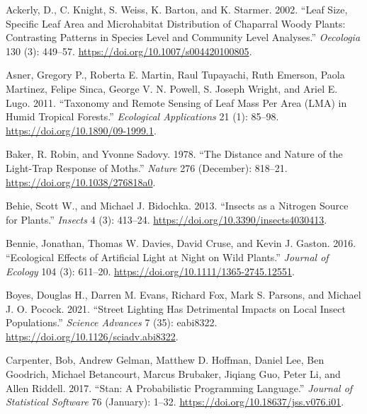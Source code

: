 \documentclass[
  letterpaper,
  DIV=11,
  numbers=noendperiod]{scrartcl}
\newlength{\cslhangindent}
\newlength{\cslentryspacingunit} %
\newenvironment{CSLReferences}[2] %
 {%
  \setlength{\parindent}{0pt}
  \ifodd #1
  \let\oldpar\par
  \def\par{\hangindent=\cslhangindent\oldpar}
  \fi
  \setlength{\parskip}{#2\cslentryspacingunit}
 }%
 {}
\begin{document}
\hypertarget{refs}{}
\begin{CSLReferences}{1}{0}
\leavevmode{}%
Ackerly, D., C. Knight, S. Weiss, K. Barton, and K. Starmer. 2002.
{``Leaf Size, Specific Leaf Area and Microhabitat Distribution of
Chaparral Woody Plants: Contrasting Patterns in Species Level and
Community Level Analyses.''} \emph{Oecologia} 130 (3): 449--57.
\url{https://doi.org/10.1007/s004420100805}.

\leavevmode{}%
Asner, Gregory P., Roberta E. Martin, Raul Tupayachi, Ruth Emerson,
Paola Martinez, Felipe Sinca, George V. N. Powell, S. Joseph Wright, and
Ariel E. Lugo. 2011. {``Taxonomy and Remote Sensing of Leaf Mass Per
Area ({LMA}) in Humid Tropical Forests.''} \emph{Ecological
Applications} 21 (1): 85--98. \url{https://doi.org/10.1890/09-1999.1}.

\leavevmode{}%
Baker, R. Robin, and Yvonne Sadovy. 1978. {``The Distance and Nature of
the Light-Trap Response of Moths.''} \emph{Nature} 276 (December):
818--21. \url{https://doi.org/10.1038/276818a0}.

\leavevmode{}%
Behie, Scott W., and Michael J. Bidochka. 2013. {``Insects as a
{Nitrogen Source} for {Plants}.''} \emph{Insects} 4 (3): 413--24.
\url{https://doi.org/10.3390/insects4030413}.

\leavevmode{}%
Bennie, Jonathan, Thomas W. Davies, David Cruse, and Kevin J. Gaston.
2016. {``Ecological Effects of Artificial Light at Night on Wild
Plants.''} \emph{Journal of Ecology} 104 (3): 611--20.
\url{https://doi.org/10.1111/1365-2745.12551}.

\leavevmode{}%
Boyes, Douglas H., Darren M. Evans, Richard Fox, Mark S. Parsons, and
Michael J. O. Pocock. 2021. {``Street Lighting Has Detrimental Impacts
on Local Insect Populations.''} \emph{Science Advances} 7 (35):
eabi8322. \url{https://doi.org/10.1126/sciadv.abi8322}.

\leavevmode{}%
Carpenter, Bob, Andrew Gelman, Matthew D. Hoffman, Daniel Lee, Ben
Goodrich, Michael Betancourt, Marcus Brubaker, Jiqiang Guo, Peter Li,
and Allen Riddell. 2017. {``Stan: {A Probabilistic Programming
Language}.''} \emph{Journal of Statistical Software} 76 (January):
1--32. \url{https://doi.org/10.18637/jss.v076.i01}.


\end{CSLReferences}
\end{document}
